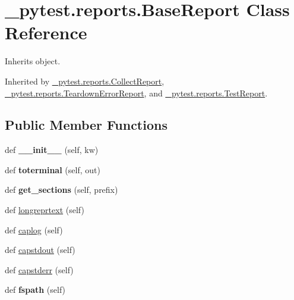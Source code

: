 \hypertarget{class__pytest_1_1reports_1_1_base_report}{}\section{\+\_\+pytest.\+reports.\+Base\+Report Class Reference}
\label{class__pytest_1_1reports_1_1_base_report}


Inherits object.



Inherited by \hyperlink{class__pytest_1_1reports_1_1_collect_report}{\+\_\+pytest.\+reports.\+Collect\+Report}, \hyperlink{class__pytest_1_1reports_1_1_teardown_error_report}{\+\_\+pytest.\+reports.\+Teardown\+Error\+Report}, and \hyperlink{class__pytest_1_1reports_1_1_test_report}{\+\_\+pytest.\+reports.\+Test\+Report}.

\subsection*{Public Member Functions}
\begin{DoxyCompactItemize}
\item 
\mbox{\label{class__pytest_1_1reports_1_1_base_report_acd7f35339e48e24341f19cee459772e9}} 
def {\bfseries \+\_\+\+\_\+init\+\_\+\+\_\+} (self, kw)
\item 
\mbox{\label{class__pytest_1_1reports_1_1_base_report_ab4c4bc622f454dad96e8b6140cc9ee43}} 
def {\bfseries toterminal} (self, out)
\item 
\mbox{\label{class__pytest_1_1reports_1_1_base_report_aa178862a6d5c21f897ae8f65503fa37c}} 
def {\bfseries get\+\_\+sections} (self, prefix)
\item 
def \hyperlink{class__pytest_1_1reports_1_1_base_report_ab2a286761e9256f3204d1246bfe43866}{longreprtext} (self)
\item 
def \hyperlink{class__pytest_1_1reports_1_1_base_report_a1c08aee6793feac67390e36cf3d183fb}{caplog} (self)
\item 
def \hyperlink{class__pytest_1_1reports_1_1_base_report_a10da4e85e2bc5d828d92fa11160273a1}{capstdout} (self)
\item 
def \hyperlink{class__pytest_1_1reports_1_1_base_report_af64206622f73f444e79e96cb5918499f}{capstderr} (self)
\item 
\mbox{\label{class__pytest_1_1reports_1_1_base_report_a8e154f5fcf105a210bc09114c1ebb9f9}} 
def {\bfseries fspath} (self)
\end{DoxyCompactItemize}
